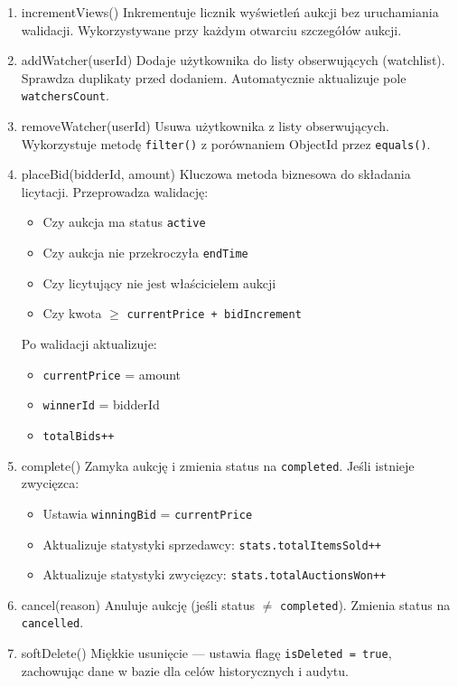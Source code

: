 \begin{enumerate}
  \item incrementViews()
        Inkrementuje licznik wyświetleń aukcji bez uruchamiania walidacji. Wykorzystywane przy każdym otwarciu szczegółów aukcji.
  \item addWatcher(userId)
        Dodaje użytkownika do listy obserwujących (watchlist). Sprawdza duplikaty przed dodaniem. Automatycznie aktualizuje pole \texttt{watchersCount}.
  \item removeWatcher(userId)
        Usuwa użytkownika z listy obserwujących. Wykorzystuje metodę \texttt{filter()} z porównaniem ObjectId przez \texttt{equals()}.
  \item placeBid(bidderId, amount)
        Kluczowa metoda biznesowa do składania licytacji. Przeprowadza  walidację:
        \begin{itemize}
          \item Czy aukcja ma status \texttt{active}
          \item Czy aukcja nie przekroczyła \texttt{endTime}
          \item Czy licytujący nie jest właścicielem aukcji
          \item Czy kwota $\geq$ \texttt{currentPrice + bidIncrement}
        \end{itemize}

        Po walidacji aktualizuje:
        \begin{itemize}
          \item \texttt{currentPrice} = amount
          \item \texttt{winnerId} = bidderId
          \item \texttt{totalBids++}
        \end{itemize}

  \item complete()
        Zamyka aukcję i zmienia status na \texttt{completed}. Jeśli istnieje zwycięzca:
        \begin{itemize}
          \item Ustawia \texttt{winningBid} = \texttt{currentPrice}
          \item Aktualizuje statystyki sprzedawcy: \texttt{stats.totalItemsSold++}
          \item Aktualizuje statystyki zwycięzcy: \texttt{stats.totalAuctionsWon++}
        \end{itemize}
  \item cancel(reason)
        Anuluje aukcję (jeśli status $\neq$ \texttt{completed}). Zmienia status na \texttt{cancelled}.
  \item softDelete()
        Miękkie usunięcie --- ustawia flagę \texttt{isDeleted = true}, zachowując dane w bazie dla celów historycznych i audytu.
\end{enumerate}

